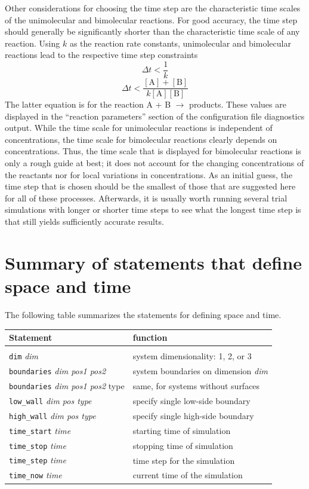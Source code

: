 \documentclass {book}
\newcommand {\ttt} {\texttt}
\newcommand {\param} {\textit}
\begin{document}
Other considerations for choosing the time step are the characteristic time scales of the unimolecular and bimolecular reactions. For good accuracy, the time step should generally be significantly shorter than the characteristic time scale of any reaction. Using $k$ as the reaction rate constants, unimolecular and bimolecular reactions lead to the respective time step constraints
$$\Delta t < \frac{1}{k}$$
$$\Delta t < \frac{[\textrm{A}]+[\textrm{B}]}{k[\textrm{A}][\textrm{B}]}$$
The latter equation is for the reaction A + B $\rightarrow$ products. These values are displayed in the ``reaction parameters'' section of the configuration file diagnostics output. While the time scale for unimolecular reactions is independent of concentrations, the time scale for bimolecular reactions clearly depends on concentrations. Thus, the time scale that is displayed for bimolecular reactions is only a rough guide at best; it does not account for the changing concentrations of the reactants nor for local variations in concentrations.
As an initial guess, the time step that is chosen should be the smallest of those that are suggested here for all of these processes. Afterwards, it is usually worth running several trial simulations with longer or shorter time steps to see what the longest time step is that still yields sufficiently accurate results.

\section{Summary of statements that define space and time}

The following table summarizes the statements for defining space and time.

\begin{longtable}[c]{ll}
Statement & function\\
\hline\\
\ttt{dim} \param{dim} & system dimensionality: 1, 2, or 3\\
\ttt{boundaries} \param{dim pos1 pos2} & system boundaries on dimension \param{dim}\\
\ttt{boundaries} \param{dim pos1 pos2} type & same, for systems without surfaces\\
\ttt{low\_wall} \param{dim pos type} & specify single low-side boundary\\
\ttt{high\_wall} \param{dim pos type} & specify single high-side boundary\\
\ttt{time\_start} \param{time} & starting time of simulation\\
\ttt{time\_stop} \param{time} & stopping time of simulation\\
\ttt{time\_step} \param{time} & time step for the simulation\\
\ttt{time\_now} \param{time} & current time of the simulation
\end{longtable}
\end{document}
